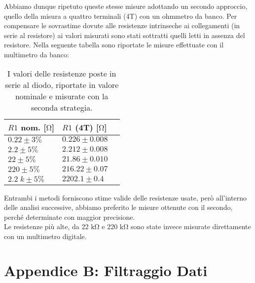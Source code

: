 \documentclass{article}[a4paper, oneside, 11pt]
\begin{document}
Abbiamo dunque ripetuto queste stesse misure adottando un secondo approccio,
quello della misura a quattro terminali (4T) con un ohmmetro da banco.
Per compensare le sovrastime dovute alle resistenze intrinseche ai
collegamenti (in serie al resistore) ai valori misurati sono stati sottratti
quelli letti in assenza del resistore.
Nella seguente tabella sono riportate le misure effettuate con il multimetro
da banco:

\begin{table}[H]
	\begin{center}
		\begin{tabular}{lll}
		\toprule
		$R1$ nom. [$\si{\ohm}$] & $R1$ (4T) [$\si{\ohm}$] \\
		\midrule
		\midrule
		$0.22 \pm 3 \% $     & $0.226 \pm 0.008$ \\
		$2.2 \pm 5 \% $     & $2.212 \pm 0.008$ \\
		$22 \pm 5 \% $     & $21.86 \pm 0.010$ \\
		$220 \pm 5 \% $     & $216.22 \pm 0.07$ \\
		$2.2\; \si{k} \pm 5 \% $ & $2202.1 \pm 0.4$ \\
		\bottomrule
    	\end{tabular}
    \caption{I valori delle resistenze poste in serie al diodo, riportate in
       		 valore nominale e misurate con la seconda strategia. \label{tab:res}}
	\end{center}
\end{table}

Entrambi i metodi forniscono stime valide delle resistenze usate, per\`o 
all'interno delle analisi successive, abbiamo preferito le misure ottenute
con il secondo, perch\'e determinate con maggior precisione.\\
Le resistenze pi\`u alte, da 22 $\si{\kohm}$ e 220 $\si{\kohm}$ sono state
invece misurate direttamente con un multimetro digitale.

\section{Appendice B: Filtraggio Dati}\label{app: B}
\end{document}
